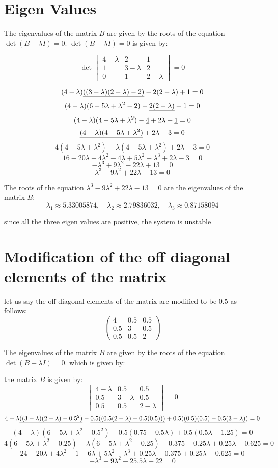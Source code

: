 \documentclass{article}
\begin{document}
\section{Eigen Values}
The eigenvalues of the matrix \(B\) are given by the roots of the equation \(\det(B - \lambda I) = 0\).
\(\det(B - \lambda I) = 0\) is given by:

\[
\det\begin{vmatrix}
4-\lambda & 2 & 1 \\
1 & 3-\lambda & 2 \\
0 & 1 & 2-\lambda
\end{vmatrix} = 0
\]

\[(4-\lambda)\uline{((3-\lambda)(2-\lambda) - 2)} - 2(2-\lambda) + 1  = 0\]
\[(4-\lambda)(6 - 5\lambda + \lambda^2 - 2) - \uline{2(2-\lambda)} + 1 = 0\]
\[(4-\lambda)(4 - 5\lambda + \lambda^2) -\uline{4} + 2\lambda + \uline{1} = 0\]
\[\uline{(4-\lambda)(4 - 5\lambda + \lambda^2)} + 2\lambda - 3 = 0\]
\[4(4 - 5\lambda + \lambda^2) - \lambda(4 - 5\lambda + \lambda^2) + 2\lambda - 3 = 0\]
\[16 - 20\lambda + 4\lambda^2 - 4\lambda + 5\lambda^2 - \lambda^3 + 2\lambda - 3 = 0\]
\[-\lambda^3 + 9\lambda^2 - 22\lambda + 13 = 0\]
\[\lambda^3 - 9\lambda^2 + 22\lambda - 13 = 0\]

The roots of the equation \(\lambda^3 - 9\lambda^2 + 22\lambda - 13 = 0\) are the eigenvalues of the matrix \(B\):
\[\lambda_1 \approx 5.33005874, \quad \lambda_2 \approx 2.79836032, \quad \lambda_3 \approx 0.87158094\]

since all the three eigen values are positive, the system is unstable

\section{Modification of the off diagonal elements of the matrix}

let us say the off-diagonal elements of the matrix are modified to be \(0.5\) as follows:
\[\begin{pmatrix}
4 & 0.5 & 0.5 \\
0.5 & 3 & 0.5 \\
0.5 & 0.5 & 2
\end{pmatrix}\]

The eigenvalues of the matrix \(B\) are given by the roots of the equation \(\det(B - \lambda I) = 0\). which is given by:

the matrix \(B\) is given by:
\[\begin{vmatrix}
4-\lambda & 0.5 & 0.5 \\
0.5 & 3-\lambda & 0.5 \\
0.5 & 0.5 & 2-\lambda
\end{vmatrix} = 0\]
\[4-\lambda\uline{((3-\lambda)(2-\lambda) - 0.5^2)} - \uline{0.5((0.5(2-\lambda) - 0.5(0.5)))} + 0.5(\uline{(0.5)(0.5)-0.5(3-\lambda)}) = 0\]
\[(4-\lambda)(6 - 5\lambda + \lambda^2 - 0.5^2) - 0.5(0.75-0.5\lambda) + 0.5(0.5\lambda -1.25) = 0\]
\[4(6 - 5\lambda + \lambda^2 - 0.25) -\lambda(6-5\lambda + \lambda^2 - 0.25) - 0.375 + 0.25\lambda + 0.25\lambda - 0.625 = 0\]
\[24 - 20\lambda + 4\lambda^2 - 1 - 6\lambda + 5\lambda^2 - \lambda^3 + 0.25\lambda - 0.375 + 0.25\lambda - 0.625 = 0\]
\[-\lambda^3 + 9\lambda^2 - 25.5\lambda + 22 = 0\]
\end{document}
